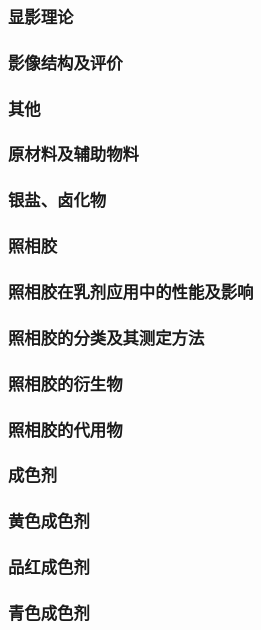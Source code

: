 \documentclass[UTF8]{../../ApplicationUniverse}
\begin{document}
    \subsubsection{显影理论}
    \subsubsection{影像结构及评价}
    \subsubsection{其他}
\subsubsection{原材料及辅助物料}
    \subsubsection{银盐、卤化物}
    \subsubsection{照相胶}
        \subsubsection{照相胶在乳剂应用中的性能及影响}
        \subsubsection{照相胶的分类及其测定方法}
        \subsubsection{照相胶的衍生物}
        \subsubsection{照相胶的代用物}
        \subsubsection{成色剂}
            \subsubsection{黄色成色剂}
            \subsubsection{品红成色剂}
            \subsubsection{青色成色剂}
\end{document}
